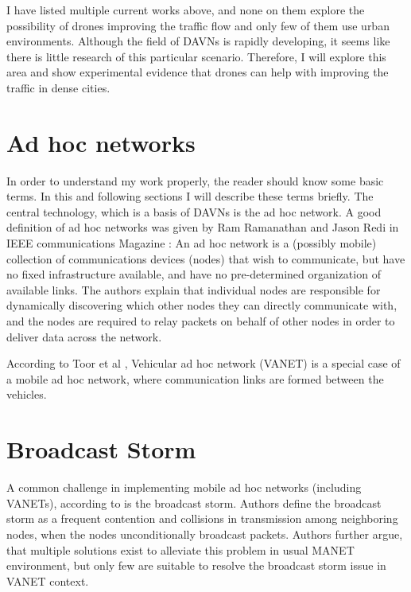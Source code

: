 \documentclass[]{nsm-thesis}
\begin{document}
I have listed multiple current works above, and none on them explore the possibility of drones improving the traffic flow and only few of them use urban environments. Although the field of \acp{DAVN} is rapidly developing, it seems like there is little research of this particular scenario. Therefore, I will explore this area and show experimental evidence that drones can help with improving the traffic in dense cities.


\section{Ad hoc networks}

In order to understand my work properly, the reader should know some basic terms. In this and following sections I will describe these terms briefly. The central technology, which is a basis of \acp{DAVN} is the ad hoc network. A good definition of ad hoc networks was given by Ram Ramanathan and Jason Redi in IEEE communications Magazine \cite{ramanathan2002brief}: An ad hoc network is a (possibly mobile) collection of communications devices (nodes) that wish to communicate, but have no fixed infrastructure available, and have no pre-determined organization of available links. The authors explain that individual nodes are responsible for dynamically discovering which other nodes they can directly communicate with, and the nodes are required to relay packets on behalf of other nodes in order to deliver data across the network.

According to Toor et al \cite{toor2008}, Vehicular ad hoc network (\ac{VANET}) is a special case of a mobile ad hoc network, where communication links are formed between the vehicles.



\section{Broadcast Storm}

A common challenge in implementing mobile ad hoc networks (including \acp{VANET}), according to \textcite{wisitrophan2007} is the broadcast storm. Authors define the broadcast storm as a frequent contention and collisions in transmission among neighboring nodes, when the nodes unconditionally broadcast packets. Authors further argue, that multiple solutions exist to alleviate this problem in usual \ac{MANET} environment, but only few are suitable to resolve the broadcast storm issue in \ac{VANET} context.
\end{document}
